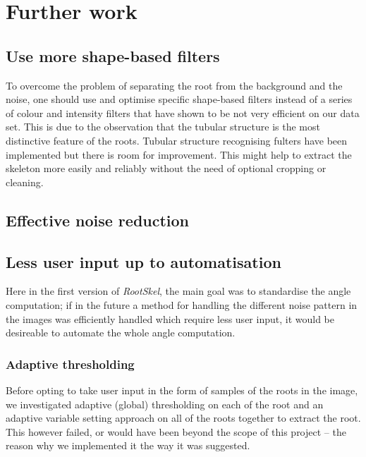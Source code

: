  
\section{Further work}


\subsection{Use more shape-based filters}

To overcome the problem of separating the root from the background and the noise, one should use and optimise specific shape-based filters instead of a series of colour and intensity filters that have shown to be not very efficient on our data set. This is due to the observation that the tubular structure is the most distinctive feature of the roots. Tubular structure recognising fulters have been implemented but there is room for improvement. This might help to extract the skeleton more easily and reliably without the need of optional cropping or cleaning.

\subsection{Effective noise reduction}



\subsection{Less user input up to automatisation}

Here in the first version of \textit{RootSkel}, the main goal was to standardise the angle computation; if in the future  a method for handling the different noise pattern in the images was efficiently handled which require less user input, it would be desireable to automate the whole angle computation.

\subsubsection{Adaptive thresholding}
Before opting to take user input in the form of samples of the roots in the image, we investigated adaptive (global) thresholding on each of the root and an adaptive variable setting approach on all of the roots together to extract the root. This however failed, or would have been beyond the scope of this project -- the reason why we implemented it the way it was suggested.



